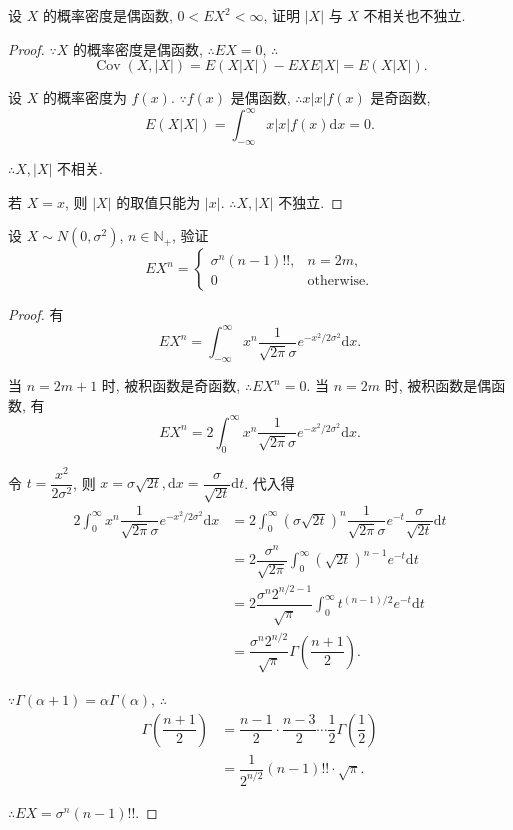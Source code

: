 \documentclass{ctexart}
\begin{document}
\begin{exercise}%
    设 $X$ 的概率密度是偶函数, $0<EX^2<\infty$, 证明 $|X|$ 与 $X$ 不相关也不独立.
\end{exercise}
\begin{proof}
    $\because X$ 的概率密度是偶函数, $\therefore EX=0$, $\therefore$
    \[\operatorname{Cov}(X,|X|)=E(X|X|)-EXE|X|=E(X|X|).\]

    设 $X$ 的概率密度为 $f(x)$. $\because f(x)$ 是偶函数, $\therefore x|x|f(x)$ 是奇函数,
    \[E(X|X|)=\int_{-\infty}^\infty x|x|f(x)\mathrm{d}x=0.\]

    $\therefore X,|X|$ 不相关.

    若 $X=x$, 则 $|X|$ 的取值只能为 $|x|$. $\therefore X,|X|$ 不独立.
\end{proof}
\begin{exercise}%
    设 $X\sim N(0,\sigma^2)$, $n\in\mathbb{N}_+$, 验证
    \[EX^n=\begin{cases}
        \sigma^n(n-1)!!, & n=2m, \\
        0 & \text{otherwise}.
    \end{cases}\]
\end{exercise}
\begin{proof}
    有
    \[EX^n=\int_{-\infty}^\infty x^n\dfrac{1}{\sqrt{2\pi}\sigma}e^{-x^2/2\sigma^2}\mathrm{d}x.\]

    当 $n=2m+1$ 时, 被积函数是奇函数, $\therefore EX^n=0$. 当 $n=2m$ 时, 被积函数是偶函数, 有
    \[EX^n=2\int_0^\infty x^n\dfrac{1}{\sqrt{2\pi}\sigma}e^{-x^2/2\sigma^2}\mathrm{d}x.\]

    令 $t=\dfrac{x^2}{2\sigma^2}$, 则 $x=\sigma\sqrt{2t},\mathrm{d}x=\dfrac{\sigma}{\sqrt{2t}}\mathrm{d}t$. 代入得
    \begin{align*}
        2\int_0^\infty x^n\dfrac{1}{\sqrt{2\pi}\sigma}e^{-x^2/2\sigma^2}\mathrm{d}x & =2\int_0^\infty(\sigma\sqrt{2t})^n\dfrac{1}{\sqrt{2\pi}\sigma}e^{-t}\dfrac{\sigma}{\sqrt{2t}}\mathrm{d}t \\
        & =2\dfrac{\sigma^n}{\sqrt{2\pi}}\int_0^\infty(\sqrt{2t})^{n-1}e^{-t}\mathrm{d}t \\
        & =2\dfrac{\sigma^n2^{n/2-1}}{\sqrt{\pi}}\int_0^\infty t^{(n-1)/2}e^{-t}\mathrm{d}t \\
        & =\dfrac{\sigma^n2^{n/2}}{\sqrt{\pi}}\Gamma\left(\dfrac{n+1}{2}\right).
    \end{align*}

    $\because\Gamma(\alpha+1)=\alpha\Gamma(\alpha)$, $\therefore$
    \begin{align*}
        \Gamma\left(\dfrac{n+1}{2}\right) & =\dfrac{n-1}{2}\cdot\dfrac{n-3}{2}\cdots\dfrac{1}{2}\Gamma\left(\dfrac{1}{2}\right) \\
        & =\dfrac{1}{2^{n/2}}(n-1)!!\cdot\sqrt{\pi}.
    \end{align*}

    $\therefore EX=\sigma^n(n-1)!!$.
\end{proof}
\end{document}
